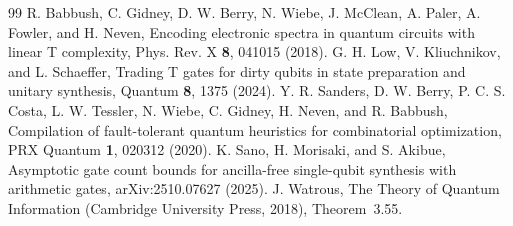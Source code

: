 \documentclass[aps,prx,twocolumn,superscriptaddress,nofootinbib,longbibliography]{revtex4-2}
\theoremstyle{plain}
\theoremstyle{definition}
\theoremstyle{remark}
\begin{document}
\begin{thebibliography}{99}
 R. Babbush, C. Gidney, D. W. Berry, N. Wiebe, J. McClean, A. Paler, A. Fowler, and H. Neven, Encoding electronic spectra in quantum circuits with linear T complexity, Phys. Rev. X \textbf{8}, 041015 (2018).
 G. H. Low, V. Kliuchnikov, and L. Schaeffer, Trading T gates for dirty qubits in state preparation and unitary synthesis, Quantum \textbf{8}, 1375 (2024).
 Y. R. Sanders, D. W. Berry, P. C. S. Costa, L. W. Tessler, N. Wiebe, C. Gidney, H. Neven, and R. Babbush, Compilation of fault-tolerant quantum heuristics for combinatorial optimization, PRX Quantum \textbf{1}, 020312 (2020).
 K. Sano, H. Morisaki, and S. Akibue, Asymptotic gate count bounds for ancilla-free single-qubit synthesis with arithmetic gates, arXiv:2510.07627 (2025).
 J. Watrous, The Theory of Quantum Information (Cambridge University Press, 2018), Theorem~3.55.
\end{thebibliography}
\end{document}
